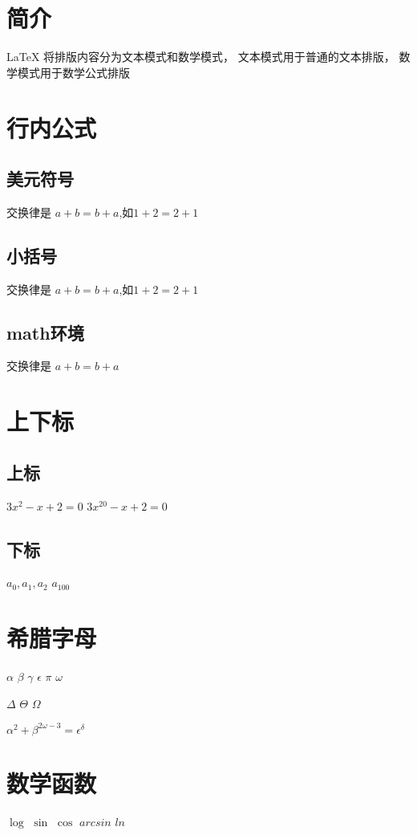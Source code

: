 \documentclass{article}
\begin{document}
    \section{简介}
    LaTeX 将排版内容分为文本模式和数学模式，
    文本模式用于普通的文本排版，
    数学模式用于数学公式排版
    \section{行内公式}
    \subsection{美元符号}
    交换律是 $a+b=b+a$,如$1+2=2+1$
    \subsection{小括号}
    交换律是 \(a+b=b+a\),如\(1+2=2+1\)
    \subsection{math环境}
    交换律是 
    \begin{math}
        a+b=b+a
    \end{math}

    \section{上下标}
    \subsection{上标}
    $3x^2 - x + 2 = 0$
    $3x^{20} - x + 2 = 0$
    \subsection{下标}
    $a_0,a_1,a_2$
    $a_{100}$
    \section{希腊字母}
    $\alpha$
    $\beta$
    $\gamma$
    $\epsilon$
    $\pi$
    $\omega$

    $\Delta$
    $\Theta$
    $\Omega$

    $\alpha^2 + \beta^{2\omega-3} = \epsilon^{\delta}$
    \section{数学函数}
    $\log$
    $\sin$
    $\cos$
    $arcsin$
    $ln$
\end{document}
